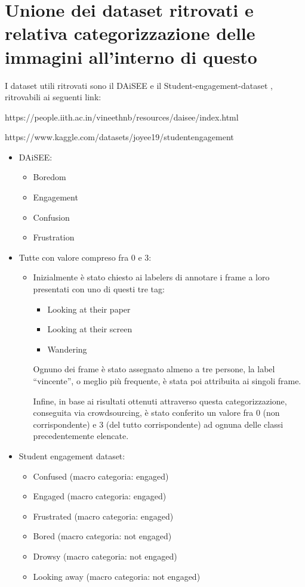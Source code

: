 \newpage

\section{Unione dei dataset ritrovati e relativa categorizzazione delle immagini all’interno di questo}

I dataset utili ritrovati sono il DAiSEE \cite{DAiSEE} e il Student-engagement-dataset \cite{StudEngagDataset}, ritrovabili ai seguenti link:

https://people.iith.ac.in/vineethnb/resources/daisee/index.html

https://www.kaggle.com/datasets/joyee19/studentengagement

\begin{itemize}
    \item DAiSEE:
    \begin{itemize}
        \item Boredom
        \item Engagement
        \item Confusion
        \item Frustration
    \end{itemize}
    \item Tutte con valore compreso fra 0 e 3:
    \begin{itemize}
        \item Inizialmente è stato chiesto ai labelers di annotare i frame a loro presentati con uno di questi tre tag:
        \begin{itemize}
            \item Looking at their paper
            \item Looking at their screen
            \item Wandering
        \end{itemize}
            
        Ognuno dei frame è stato assegnato almeno a tre persone, la label “vincente”, o meglio più frequente, è stata poi attribuita ai singoli frame.

        Infine, in base ai risultati ottenuti attraverso questa categorizzazione, conseguita via crowdsourcing, è stato conferito un valore fra 0 (non corrispondente) e 3 (del tutto corrispondente) ad ognuna delle classi precedentemente elencate.
    \end{itemize}
    \item Student engagement dataset:
    \begin{itemize}
        \item Confused (macro categoria: engaged)
        \item Engaged (macro categoria: engaged)
        \item Frustrated (macro categoria: engaged)
        \item Bored (macro categoria: not engaged)
        \item Drowsy (macro categoria: not engaged)
        \item Looking away (macro categoria: not engaged)
    \end{itemize}
\end{itemize}

